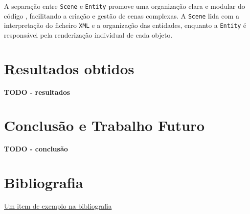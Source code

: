 \documentclass[12pt, a4paper]{article}
\begin{document}
A separação entre \texttt{Scene} e \texttt{Entity} promove uma organização clara e modular do código
, facilitando a criação e gestão de cenas complexas. A \texttt{Scene} lida com a interpretação do
ficheiro \texttt{XML} e a organização das entidades, enquanto a \texttt{Entity} é responsável pela
renderização individual de cada objeto.

\section{Resultados obtidos}

\textbf{\color{red} TODO - resultados}

\section{Conclusão e Trabalho Futuro}

\textbf{\color{red} TODO - conclusão}

\begingroup
\section{Bibliografia}
\renewcommand{\section}[2]{}

\begin{thebibliography}{9}
        \href{https://youtu.be/dQw4w9WgXcQ}{Um item de exemplo na bibliografia}
\end{thebibliography}
\endgroup
\end{document}
